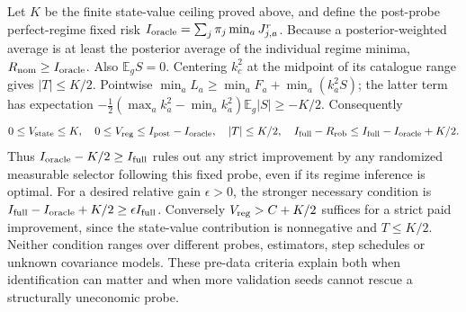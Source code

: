 Let $K$ be the finite state-value ceiling proved above, and define the
post-probe perfect-regime fixed risk
$I_{\rm oracle}=\sum_j\pi_j\min_aJ_{j,a}^{r}$.
Because a posterior-weighted average is at least the posterior average of the
individual regime minima, $R_{\rm nom}\ge I_{\rm oracle}$.
Also $\mathbb E_gS=0$. Centering $k_c^2$ at the midpoint of its catalogue range
gives $|T|\le K/2$.
Pointwise $\min_aL_a\ge\min_aF_a+\min_a(k_a^2S)$; the latter term has expectation
$-\tfrac12(\max_a k_a^2-\min_a k_a^2)\mathbb E_g|S|\ge-K/2$.
Consequently
\[
0\le V_{\rm state}\le K,\quad
0\le V_{\rm reg}\le I_{\rm post}-I_{\rm oracle},\quad
|T|\le K/2,\quad
I_{\rm full}-R_{\rm rob}\le I_{\rm full}-I_{\rm oracle}+K/2.
\]
Thus $I_{\rm oracle}-K/2\ge I_{\rm full}$ rules out any strict improvement by
any randomized measurable selector following this fixed probe, even if its
regime inference is optimal.
For a desired relative gain $\epsilon>0$, the stronger necessary condition is
$I_{\rm full}-I_{\rm oracle}+K/2\ge\epsilon I_{\rm full}$.
Conversely $V_{\rm reg}>C+K/2$ suffices for a strict paid improvement, since the
state-value contribution is nonnegative and $T\le K/2$.
Neither condition ranges over different probes, estimators, step schedules or
unknown covariance models.
These pre-data criteria explain both when identification can matter and when
more validation seeds cannot rescue a structurally uneconomic probe.
